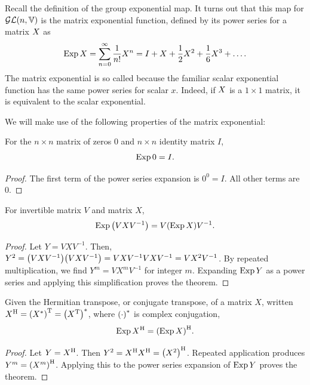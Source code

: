 \documentclass[../../main.tex]{subfiles}
\begin{document}
\begin{refsection}
	Recall the definition of the group exponential map.
	It turns out that this map for $\mathcal{GL} (n, \mathbb{V})$ is the matrix exponential function, defined by its power series for a matrix $\mat{X}$ as
	\begin{equation}\label{matexp}
		\expm \mat{X} = \sum_{n=0}^\infty \frac{1}{n!} X^n
		= I + X + \frac{1}{2} X^2 + \frac{1}{6} X^3 + \ldots.
	\end{equation}
	The matrix exponential is so called because the familiar scalar exponential function has the same power series for scalar $x$.
	Indeed, if $\mat{X}$ is a $1 \times 1$ matrix, it is equivalent to the scalar exponential.

	We will make use of the following properties of the matrix exponential:
	\begin{theorem}\label{expmzeromat}
		For the $n \times n$ matrix of zeros $0$ and $n \times n$ identity matrix $I$,
		$$\operatorname{Exp} 0 = I.$$
	\end{theorem}
	\begin{proof}
		The first term of the power series expansion is $0^0 = I$.
		All other terms are 0.
	\end{proof}

	\begin{theorem} \label{matexpfactorinverse}
		For invertible matrix $V$ and matrix $X$,
		$$\operatorname{Exp} \qty( V X V^{-1} ) = V \qty(\operatorname{Exp}{X}) V^{-1}.$$
	\end{theorem}
	\begin{proof}
		Let $Y = V X V^{-1}$.
		Then, $Y^2 = \qty(V X V^{-1}) \qty(V X V^{-1}) = V X V^{-1} V X V^{-1} = V X^2 V^{-1}$.
		By repeated multiplication, we find $Y^m = V X^m V^{-1}$ for integer $m$.
		Expanding $\operatorname{Exp} Y$ as a power series and applying this simplification proves the theorem.
	\end{proof}

	\begin{theorem}
		Given the Hermitian transpose, or conjugate transpose, of a matrix $X$, written ${X}^\mathrm{H} = {\qty({X}^*)}^\mathrm{T} = {\qty({X}^\mathrm{T})}^*$, where ${\qty(\cdot)}^*$ is complex conjugation,
		$$\operatorname{Exp} {X}^\mathrm{H} = {\qty( \operatorname{Exp} X )}^\mathrm{H}.$$
	\end{theorem}
	\begin{proof}
		Let $Y = {X}^\mathrm{H}$.
		Then $Y^2 = {X}^\mathrm{H} {X}^\mathrm{H} = {\qty( X^2 )}^\mathrm{H}$.
		Repeated application produces $Y^m = {\qty( X^m )}^\mathrm{H}$.
		Applying this to the power series expansion of $\operatorname{Exp} Y$ proves the theorem.
	\end{proof}


\end{refsection}
\end{document}
